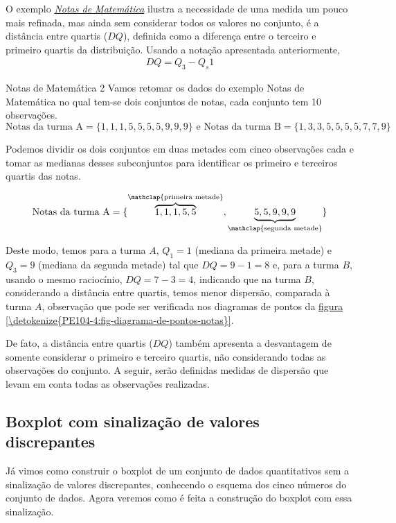 O exemplo \hyperref[exemp-notas1]{\textit{Notas de Matemática}} ilustra a necessidade de uma medida um pouco mais refinada, mas ainda sem considerar todos os valores no conjunto, é a distância entre quartis ($DQ$), definida como a diferença entre o terceiro e primeiro quartis da distribuição. Usando a notação apresentada anteriormente,
\begin{equation*}
\begin{split}DQ=Q_3-Q_s1\end{split}
\end{equation*}

\begin{example}{Notas de Matemática 2}
Vamos retomar os dados do exemplo Notas de Matemática no qual tem-se dois conjuntos de notas, cada conjunto tem 10 observações.
$$\text{Notas da turma A}=\{  1,1,1,5,5,5,5,9,9,9\} \text{ e } \text{Notas da turma B}=\{1,3,3,5,5,5,5,7,7,9\}$$

Podemos dividir os dois conjuntos em duas metades com cinco observações cada e tomar as medianas desses subconjuntos para identificar os primeiro e terceiros quartis das notas.

$$\text{Notas da turma A}=\{\overbrace{1,1,1,5,5}^{\mathclap{\text{primeira metade}}},\underbrace{5,5,9,9,9}_{\mathclap{\text{segunda metade}}}\}$$

Deste modo, temos para a turma \(A\), $Q_1=1$ (mediana da primeira metade) e $Q_3=9$ (mediana da segunda metade) tal que $DQ=9-1=8$ e, para a turma \(B\), usando o mesmo raciocínio, $DQ=7-3=4$, indicando que na turma \(B\), considerando a distância entre quartis, temos menor dispersão, comparada à turma \(A\), observação que pode ser verificada nos diagramas de pontos da  \hyperref[\detokenize{PE104-4:fig-diagrama-de-pontos-notas}]{figura \ref{\detokenize{PE104-4:fig-diagrama-de-pontos-notas}}}.
\end{example}
\needspace{4em}
De fato, a distância entre quartis ($DQ$) também apresenta a desvantagem de somente considerar o primeiro e terceiro quartis, não considerando todas as observações do conjunto. A seguir, serão definidas medidas de dispersão que levam em conta todas as observações realizadas.

\subsection{Boxplot com sinalização de valores discrepantes}

Já vimos como construir o boxplot de um conjunto de dados quantitativos sem a sinalização de valores discrepantes, conhecendo o esquema dos cinco números do conjunto de dados. Agora veremos como é feita a construção do boxplot com essa sinalização.

